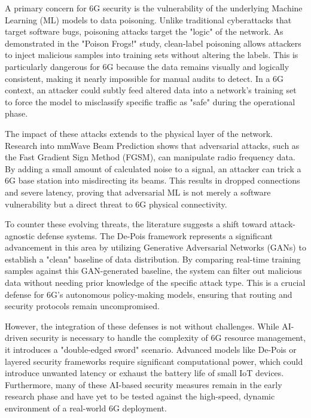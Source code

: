 \documentclass[letterpaper]{article} %
\begin{document}
A primary concern for 6G security is the vulnerability of the underlying Machine Learning (ML) models to data poisoning. Unlike traditional cyberattacks that target software bugs, poisoning attacks target the "logic" of the network. As demonstrated in the "Poison Frogs!" study, clean-label poisoning allows attackers to inject malicious samples into training sets without altering the labels. This is particularly dangerous for 6G because the data remains visually and logically consistent, making it nearly impossible for manual audits to detect. In a 6G context, an attacker could subtly feed altered data into a network’s training set to force the model to misclassify specific traffic as "safe" during the operational phase.

The impact of these attacks extends to the physical layer of the network. Research into mmWave Beam Prediction shows that adversarial attacks, such as the Fast Gradient Sign Method (FGSM), can manipulate radio frequency data. By adding a small amount of calculated noise to a signal, an attacker can trick a 6G base station into misdirecting its beams. This results in dropped connections and severe latency, proving that adversarial ML is not merely a software vulnerability but a direct threat to 6G physical connectivity.


To counter these evolving threats, the literature suggests a shift toward attack-agnostic defense systems. The De-Pois framework represents a significant advancement in this area by utilizing Generative Adversarial Networks (GANs) to establish a "clean" baseline of data distribution. By comparing real-time training samples against this GAN-generated baseline, the system can filter out malicious data without needing prior knowledge of the specific attack type. This is a crucial defense for 6G’s autonomous policy-making models, ensuring that routing and security protocols remain uncompromised.

However, the integration of these defenses is not without challenges. While AI-driven security is necessary to handle the complexity of 6G resource management, it introduces a "double-edged sword" scenario. Advanced models like De-Pois or layered security frameworks require significant computational power, which could introduce unwanted latency or exhaust the battery life of small IoT devices. Furthermore, many of these AI-based security measures remain in the early research phase and have yet to be tested against the high-speed, dynamic environment of a real-world 6G deployment.
\end{document}
